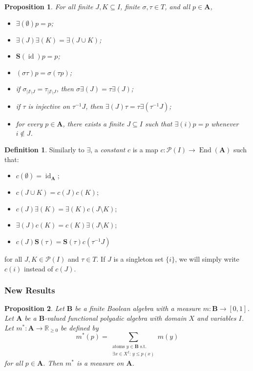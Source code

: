 \documentclass{article}
\newtheorem{proposition}{Proposition}
\theoremstyle{definition}
\newtheorem{definition}{Definition}
\theoremstyle{remark}
\DeclareMathOperator{\id}{id}
\DeclareMathOperator{\End}{End}
\begin{document}
\begin{proposition}
  For all finite $J, K \subseteq I$, finite $\sigma, \tau \in T$, and all $p \in
  \mathbf{A}$,
  \begin{itemize}
  \item $\bm\exists(\emptyset)p = p$;
  \item $\bm\exists(J)\bm\exists(K) = \bm\exists(J \cup K)$;
  \item $\mathbf{S}(\id)p = p$;
  \item $(\sigma\tau)p = \sigma(\tau p)$;
  \item if $\sigma_{|I \setminus J} = \tau_{|I \setminus J}$, then $\sigma
    \bm\exists(J) = \tau \bm\exists(J)$;
  \item if $\tau$ is injective on $\tau^{-1}J$, then $\bm\exists(J)\tau = \tau
    \bm\exists(\tau^{-1}J)$;
  \item for every $p \in \mathbf{A}$, there exists a finite $J \subseteq I$ such
    that $\bm\exists(i)p = p$ whenever $i \not\in J$.
  \end{itemize}
\end{proposition}

\begin{definition}
  Similarly to $\bm\exists$, a \emph{constant} $c$ is a map $c: \mathcal{P}(I)
  \to \End(\mathbf{A})$ such that:
  \begin{itemize}
  \item $c(\emptyset) = \id_{\mathbf{A}}$;
  \item $c(J \cup K) = c(J)c(K)$;
  \item $c(J)\bm\exists(K) = \bm\exists(K)c(J \setminus K)$;
  \item $\bm\exists(J)c(K) = c(K)\bm\exists(J \setminus K)$;
  \item $c(J)\mathbf{S}(\tau) = \mathbf{S}(\tau)c(\tau^{-1}J)$
  \end{itemize}
  for all $J, K \in \mathcal{P}(I)$ and $\tau \in T$. If $J$ is a singleton
  set $\{ i \}$, we will simply write $c(i)$ instead of $c(J)$.
\end{definition}

\subsubsection{New Results}

\begin{proposition} \label{prop:polyadic_measure}
  Let $\mathbf{B}$ be a finite Boolean algebra with a measure $m :
  \mathbf{B} \to [0, 1]$. Let $\mathbf{A}$ be a $\mathbf{B}$-valued functional
  polyadic algebra with domain $X$ and variables $I$. Let $m^* : \mathbf{A} \to
  \mathbb{R}_{\ge 0}$ be defined by
  \[
    m^*(p) = \sum_{\substack{\text{atoms }y \in \mathbf{B} \text{ s.t.}\\ \exists x \in X^I:\, y \le p(x)}} m(y)
  \]
  for all $p \in \mathbf{A}$. Then $m^*$ is a measure on $\mathbf{A}$.
\end{proposition}
\end{document}
